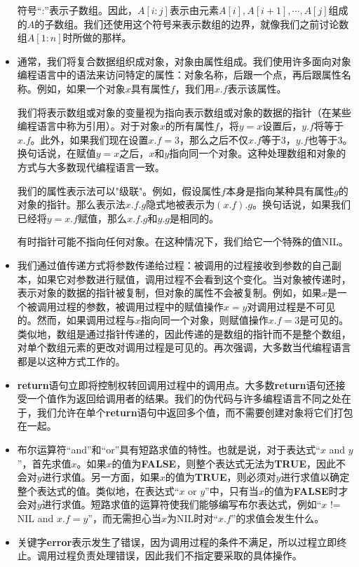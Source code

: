 \documentclass[lang=cn,newtx,10pt,scheme=chinese]{elegantbook}
\begin{document}
\begin{itemize}
    符号“:”表示子数组。因此，$A[i:j]$表示由元素$A[i],A[i+1],\cdots,A[j]$组成的$A$的子数组。我们还使用这个符号来表示数组的边界，就像我们之前讨论数组$A[1:n]$时所做的那样。
    \item 通常，我们将复合数据组织成对象，对象由属性组成。我们使用许多面向对象编程语言中的语法来访问特定的属性：对象名称，后跟一个点，再后跟属性名称。例如，如果一个对象$x$具有属性$f$，我们用$x.f$表示该属性。

    我们将表示数组或对象的变量视为指向表示数组或对象的数据的指针（在某些编程语言中称为引用）。对于对象$x$的所有属性$f$，将$y = x$设置后，$y.f$将等于$x.f$。此外，如果我们现在设置$x.f = 3$，那么之后不仅$x.f$等于3，$y.f$也等于3。换句话说，在赋值$y = x$之后，$x$和$y$指向同一个对象。这种处理数组和对象的方式与大多数现代编程语言一致。
    
    我们的属性表示法可以"级联"。例如，假设属性$f$本身是指向某种具有属性$g$的对象的指针。那么表示法$x.f.g$隐式地被表示为$(x.f).g$。换句话说，如果我们已经将$y = x.f$赋值，那么$x.f.g$和$y.g$是相同的。
    
    有时指针可能不指向任何对象。在这种情况下，我们给它一个特殊的值NIL。
    \item 我们通过值传递方式将参数传递给过程：被调用的过程接收到参数的自己副本，如果它对参数进行赋值，调用过程不会看到这个变化。当对象被传递时，表示对象的数据的指针被复制，但对象的属性不会被复制。例如，如果$x$是一个被调用过程的参数，被调用过程中的赋值操作$x=y$对调用过程是不可见的。然而，如果调用过程与$x$指向同一个对象，则赋值操作$x.f=3$是可见的。类似地，数组是通过指针传递的，因此传递的是数组的指针而不是整个数组，对单个数组元素的更改对调用过程是可见的。再次强调，大多数当代编程语言都是以这种方式工作的。
    \item \textbf{return}语句立即将控制权转回调用过程中的调用点。大多数\textbf{return}语句还接受一个值作为返回给调用者的结果。我们的伪代码与许多编程语言不同之处在于，我们允许在单个\textbf{return}语句中返回多个值，而不需要创建对象将它们打包在一起。
    \item 布尔运算符``and''和``or''具有短路求值的特性。也就是说，对于表达式``$x$ and $y$''，首先求值$x$。如果$x$的值为\textbf{FALSE}，则整个表达式无法为\textbf{TRUE}，因此不会对$y$进行求值。另一方面，如果$x$的值为\textbf{TRUE}，则必须对$y$进行求值以确定整个表达式的值。类似地，在表达式``$x$ or $y$''中，只有当$x$的值为\textbf{FALSE}时才会对$y$进行求值。短路求值的运算符使我们能够编写布尔表达式，例如``$x$ != NIL and $x.f=y$''，而无需担心当$x$为NIL时对``$x.f$''的求值会发生什么。
    \item 关键字\textbf{error}表示发生了错误，因为调用过程的条件不满足，所以过程立即终止。调用过程负责处理错误，因此我们不指定要采取的具体操作。
\end{itemize}
\end{document}

